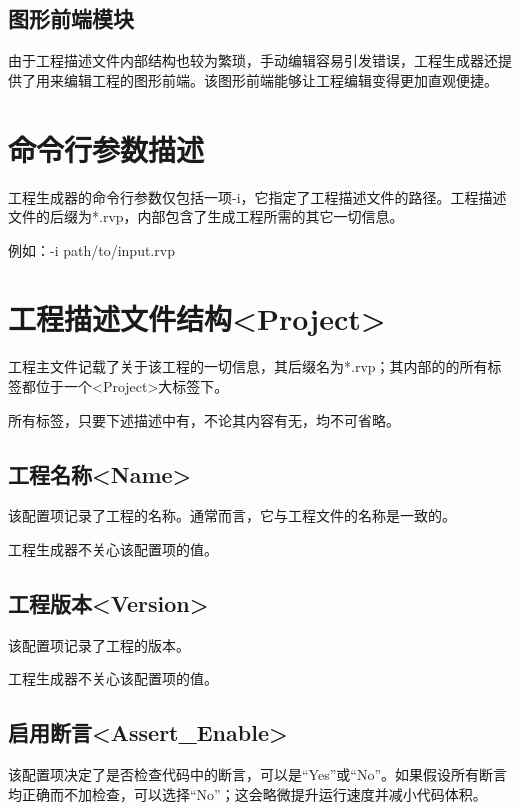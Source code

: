 \subsection{图形前端模块}\label{subsec:5-1-4}

由于工程描述文件内部结构也较为繁琐，手动编辑容易引发错误，工程生成器还提供了用来编辑工程的图形前端。该图形前端能够让工程编辑变得更加直观便捷。


\section{命令行参数描述}\label{sec:5-2}

工程生成器的命令行参数仅包括一项-i，它指定了工程描述文件的路径。工程描述文件的后缀为*.rvp，内部包含了生成工程所需的其它一切信息。

例如：-i path/to/input.rvp


\section{工程描述文件结构<Project>{}}\label{sec:5-3}

工程主文件记载了关于该工程的一切信息，其后缀名为*.rvp；其内部的的所有标签都位于一个<Project>{}大标签下。

所有标签，只要下述描述中有，不论其内容有无，均不可省略。

\subsection{工程名称<Name>{}}\label{subsec:5-3-1}

该配置项记录了工程的名称。通常而言，它与工程文件的名称是一致的。

工程生成器不关心该配置项的值。

\subsection{工程版本<Version>{}}\label{subsec:5-3-2}

该配置项记录了工程的版本。

工程生成器不关心该配置项的值。

\subsection{启用断言<Assert\_Enable>{}}\label{subsec:5-3-3}

该配置项决定了是否检查代码中的断言，可以是``Yes''或``No''。如果假设所有断言均正确而不加检查，可以选择``No''；这会略微提升运行速度并减小代码体积。

